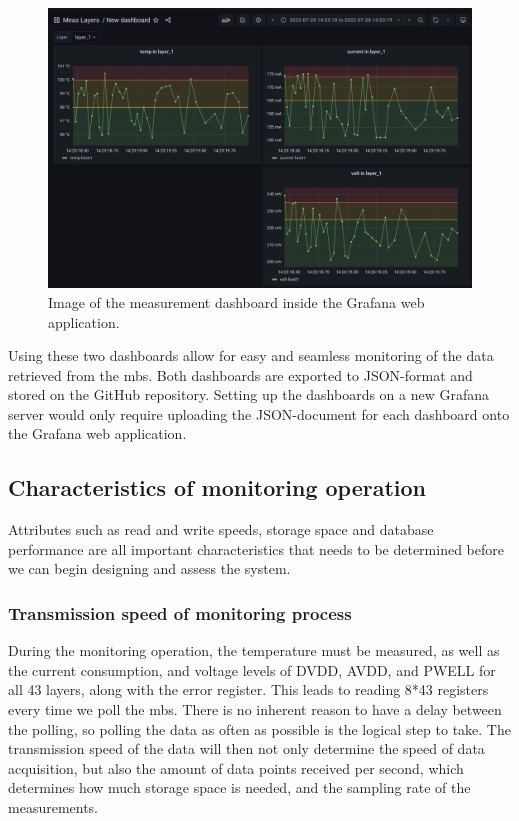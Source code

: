 \documentclass[main.tex]{subfiles}
\begin{document}
\begin{figure}[!htpb]
    \centering
    \includegraphics[width=15cm, scale=4]{images/grafana_2nd_dashboard.png}
    \caption{Image of the measurement dashboard inside the Grafana web application.}
    \label{fig: grafana second}
\end{figure}
\FloatBarrier

Using these two dashboards allow for easy and seamless monitoring of the data retrieved from the \gls{mb}s. Both dashboards are exported to JSON-format and stored on the GitHub repository. Setting up the dashboards on a new Grafana server would only require uploading the JSON-document for each dashboard onto the Grafana web application.



\subsection{Characteristics of monitoring operation}
\label{ssec: char_mon}
Attributes such as read and write speeds, storage space and database performance are all important characteristics that needs to be determined before we can begin designing and assess the system.

\subsubsection{Transmission speed of monitoring process}
During the monitoring operation, the temperature must be measured, as well as the current consumption, and voltage levels of DVDD, AVDD, and PWELL for all 43 layers, along with the error register. This leads to reading 8*43 registers every time we poll the \gls{mb}s. There is no inherent reason to have a delay between the polling, so polling the data as often as possible is the logical step to take. The transmission speed of the data will then not only determine the speed of data acquisition, but also the amount of data points received per second, which determines how much storage space is needed, and the sampling rate of the measurements.
\end{document}
